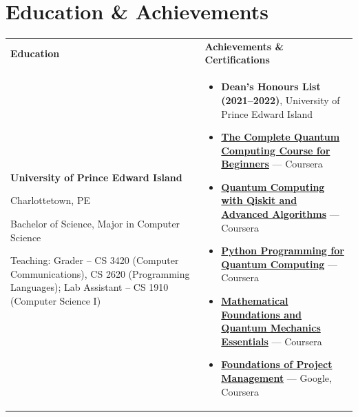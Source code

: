 \documentclass[a4paper,10pt]{article}
\begin{document}
\section*{Education \& Achievements}

\noindent
\begin{tabularx}{\textwidth}{@{}>{\raggedright\arraybackslash}X >{\raggedright\arraybackslash}X@{}}
\textbf{Education} & \textbf{Achievements \& Certifications} \\
\addlinespace[4pt]

\textbf{University of Prince Edward Island} \par
Charlottetown, PE \par
Bachelor of Science, Major in Computer Science \par
Teaching: Grader -- CS 3420 (Computer Communications), CS 2620 (Programming Languages); 
Lab Assistant -- CS 1910 (Computer Science I)
&
\begin{itemize}[leftmargin=1.2em, itemsep=2pt, topsep=2pt]
  \item \textbf{Dean’s Honours List (2021--2022)}, University of Prince Edward Island

  \item \href{https://coursera.org/share/5969e8ed899773d422e5701ac559e1c1}
  {\textbf{The Complete Quantum Computing Course for Beginners}} — Coursera

  \item \href{https://coursera.org/share/158ce8078de18f7b008995f73c2661be}
  {\textbf{Quantum Computing with Qiskit and Advanced Algorithms}} — Coursera

  \item \href{https://www.coursera.org/account/accomplishments/records/JRF854Y0WN9L}
  {\textbf{Python Programming for Quantum Computing}} — Coursera

  \item \href{https://www.coursera.org/account/accomplishments/verify/UUQLY52S2333}
  {\textbf{Mathematical Foundations and Quantum Mechanics Essentials}} — Coursera

  \item \href{https://www.coursera.org/account/accomplishments/verify/A3JHFH1FVXWV}
  {\textbf{Foundations of Project Management}} — Google, Coursera
\end{itemize}
\end{tabularx}
\end{document}
